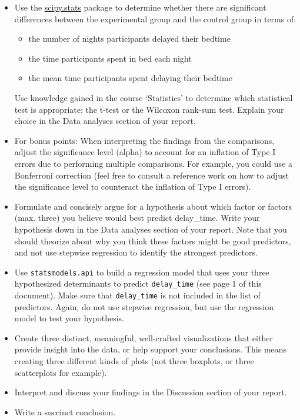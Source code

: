 \documentclass[a4paper]{report}
\theoremstyle{definition}
\begin{document}
\begin{itemize}
		\item Use the \href{http://docs.scipy.org/doc/scipy/reference/stats.html}{scipy.stats} package to determine whether there are significant differences between	the experimental group and the control group in terms of:
		\begin{itemize}
			\item the number of nights participants delayed their bedtime
			\item the time participants spent in bed each night
			\item the mean time participants spent delaying their bedtime
		\end{itemize}
		Use knowledge gained in the course `Statistics' to determine which statistical test is appropriate: the t-test or the Wilcoxon rank-sum test. Explain your choice in the Data analyses section of your report.
		
		\item For bonus points: When interpreting the findings from the	comparisons, adjust the significance level (alpha) to account for an inflation of Type I errors due to performing multiple comparisons. For example, you could use a Bonferroni correction (feel free to consult a reference work on how to adjust the significance level to counteract the inflation of Type I errors).
		
		\item Formulate and concisely argue for a hypothesis about which factor or factors (max. three) you believe would best predict delay\_time. Write your hypothesis down in the Data analyses section of your report. Note that you should theorize about why you think these factors might be good predictors, and not use stepwise regression to identify the strongest predictors.
		
		\item Use \texttt{\small statsmodels.api} to build a regression model that uses your three hypothesized determinants to predict \texttt{delay\_time} (see page 1 of this document). Make sure that \texttt{delay\_time} is not included in the list of predictors. Again, do not use stepwise regression, but use the regression model to test your hypothesis.
		
		\item Create three distinct, meaningful, well-crafted visualizations that either provide insight into the data, or help support your conclusions. This means creating three different kinds of plots (not three boxplots, or three scatterplots for example).
		
		\item Interpret and discuss your findings in the Discussion section of your report.
		
		\item Write a succinct conclusion.
	\end{itemize}
	
\end{document}
